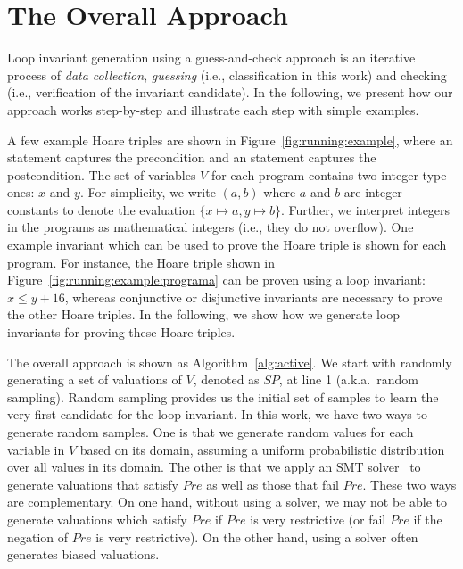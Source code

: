 \section{The Overall Approach}
\label{sec:overview}
Loop invariant generation using a guess-and-check approach is an iterative process of \emph{data collection}, \emph{guessing} (i.e., classification in this work) and checking (i.e., verification of the invariant candidate).
In the following, we present how our approach works step-by-step and illustrate each step with simple examples.

\begin{example}
A few example Hoare triples are shown in Figure~\ref{fig:running:example}, where an  statement captures the precondition and an  statement captures the postcondition.
The set of variables $V$ for each program contains two integer-type ones: $x$ and $y$. For simplicity, we write $(a, b)$ where $a$ and $b$ are integer constants to denote the  evaluation $\{x \mapsto a, y \mapsto b\}$. Further, we interpret integers in the programs as mathematical integers (i.e., they do not overflow).
One example invariant which can be used to prove the Hoare triple is shown for each program. For instance, the Hoare triple shown in Figure~\ref{fig:running:example:programa} can be proven using a loop invariant: $x \le y + 16$, whereas conjunctive or disjunctive invariants are necessary to prove the other Hoare triples. In the following, we show how we generate loop invariants for proving these Hoare triples.
\end{example}
\noindent The overall approach is shown as Algorithm~\ref{alg:active}. We start with randomly generating a set of valuations of $V$, denoted as $SP$, at line 1 (a.k.a.~random sampling). Random sampling provides us the initial set of samples to learn the very first candidate for the loop invariant.
In this work, we have two ways to generate random samples. One is that we generate random values for each variable in $V$ based on its domain,
assuming a uniform probabilistic distribution over all values in its domain.
The other is that we apply an SMT solver~\cite{barrett2009satisfiability,de2008z3} to generate valuations that satisfy $Pre$
as well as those that fail $Pre$. These two ways are complementary.
On one hand, without using a solver, we may not be able to generate valuations which satisfy $Pre$ if $Pre$ is very restrictive
(or fail $Pre$ if the negation of $Pre$ is very restrictive). On the other hand, using a solver often generates biased valuations. %

